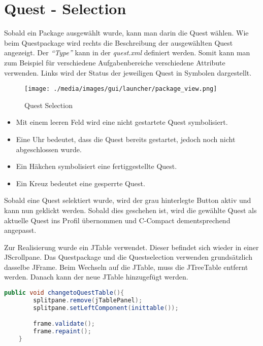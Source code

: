 \section{Quest - Selection}

Sobald ein Package ausgewählt wurde, kann man darin die Quest wählen. Wie beim Questpackage wird rechts die Beschreibung der ausgewählten Quest angezeigt. Der \textit{"`Type"'} kann in der \textit{quest.xml} definiert werden. Somit kann man zum Beispiel für verschiedene Aufgabenbereiche verschiedene Attribute verwenden. Links wird der Status der jeweiligen Quest in Symbolen dargestellt.

\begin{figure}[h] 
  \centering
     \texttt{[image: ./media/images/gui/launcher/package\_view.png]}
  \caption{Quest Selection}
  \label{fig:Bild1}
\end{figure}

\begin{itemize}
\item Mit einem leeren Feld wird eine nicht gestartete Quest symbolisiert.
\item Eine Uhr bedeutet, dass die Quest bereits gestartet, jedoch noch nicht abgeschlossen wurde.
\item Ein Häkchen symbolisiert eine fertiggestellte Quest.
\item Ein Kreuz bedeutet eine gesperrte Quest. 
\end{itemize}

Sobald eine Quest selektiert wurde, wird der grau hinterlegte Button aktiv und kann nun geklickt werden. Sobald dies geschehen ist, wird die gewählte Quest als aktuelle Quest ins Profil übernommen und C-Compact dementsprechend angepasst.

Zur Realisierung wurde ein JTable verwendet. Dieser befindet sich wieder in einer JScrollpane. Das Questpackage und die Questselection verwenden grundsätzlich dasselbe JFrame. Beim Wechseln auf die JTable, muss die JTreeTable entfernt werden. Danach kann der neue JTable hinzugefügt werden.
\begin{lstlisting}[language=JAVA]
	public void changetoQuestTable(){
		splitpane.remove(jTablePanel);
		splitpane.setLeftComponent(inittable());

		frame.validate();
		frame.repaint();
	}
\end{lstlisting}

